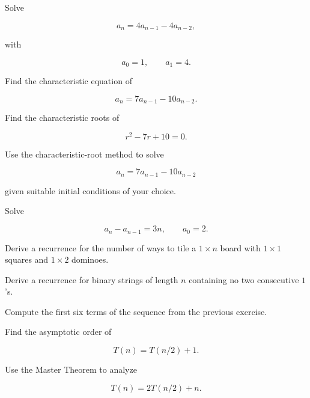 \begin{exercise}[2]
Solve

\[
a_n=4a_{n-1}-4a_{n-2},
\]

with

\[
a_0=1,
\qquad
a_1=4.
\]
\end{exercise}

\begin{exercise}[2]
Find the characteristic equation of

\[
a_n
=
7a_{n-1}
-
10a_{n-2}.
\]
\end{exercise}

\begin{exercise}[2]
Find the characteristic roots of

\[
r^2-7r+10=0.
\]
\end{exercise}

\begin{exercise}[2]
Use the characteristic-root method to solve

\[
a_n
=
7a_{n-1}
-
10a_{n-2}
\]

given suitable initial conditions of your choice.
\end{exercise}

\begin{exercise}[2]
Solve

\[
a_n-a_{n-1}=3n,
\qquad
a_0=2.
\]
\end{exercise}

\begin{exercise}[2]
Derive a recurrence for the number of ways to tile a \(1\times n\)
board with \(1\times1\) squares and \(1\times2\) dominoes.
\end{exercise}

\begin{exercise}[2]
Derive a recurrence for binary strings of length \(n\) containing no
two consecutive \(1\)'s.
\end{exercise}

\begin{exercise}[2]
Compute the first six terms of the sequence from the previous exercise.
\end{exercise}

\begin{exercise}[2]
Find the asymptotic order of

\[
T(n)=T(n/2)+1.
\]
\end{exercise}

\begin{exercise}[2]
Use the Master Theorem to analyze

\[
T(n)=2T(n/2)+n.
\]
\end{exercise}

